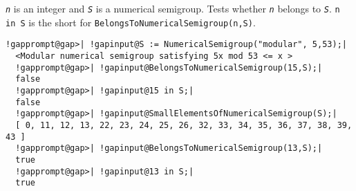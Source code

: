 \documentclass[a4paper,11pt]{report}
\begin{document}
{{{ \mbox{\texttt{\mdseries\slshape n}} is an integer and \mbox{\texttt{\mdseries\slshape S}} is a numerical semigroup. Tests whether \mbox{\texttt{\mdseries\slshape n}} belongs to \mbox{\texttt{\mdseries\slshape S}}. \texttt{n in S} is the short for \texttt{BelongsToNumericalSemigroup(n,S)}. 
\begin{Verbatim}[commandchars=!@|,fontsize=\small,frame=single,label=Example]
  !gapprompt@gap>| !gapinput@S := NumericalSemigroup("modular", 5,53);|
  <Modular numerical semigroup satisfying 5x mod 53 <= x >
  !gapprompt@gap>| !gapinput@BelongsToNumericalSemigroup(15,S);|
  false
  !gapprompt@gap>| !gapinput@15 in S;|
  false
  !gapprompt@gap>| !gapinput@SmallElementsOfNumericalSemigroup(S);|
  [ 0, 11, 12, 13, 22, 23, 24, 25, 26, 32, 33, 34, 35, 36, 37, 38, 39, 43 ]
  !gapprompt@gap>| !gapinput@BelongsToNumericalSemigroup(13,S);|
  true
  !gapprompt@gap>| !gapinput@13 in S;|
  true
\end{Verbatim}
 }

 }

 }

 
\end{document}
